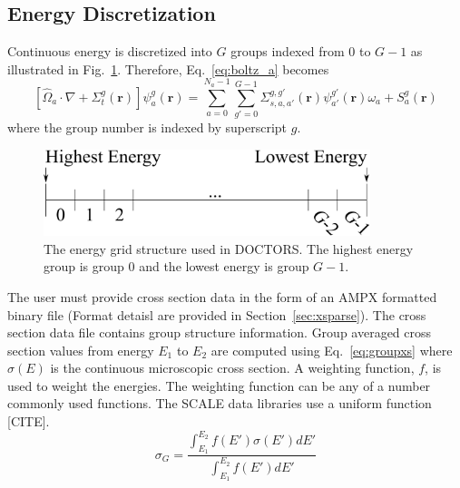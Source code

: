 \subsection{Energy Discretization}

Continuous energy is discretized into $G$ groups indexed from 0 to $G-1$ as illustrated in Fig.~\ref{fig:energy_groups}. Therefore, Eq.~\ref{eq:boltz_a} becomes
\begin{equation} \label{eq:boltz_e}
\left[ \hat{\Omega}_a \cdot \nabla + \Sigma_t^g(\boldsymbol{r}) \right]
\psi_{a}^{g}(\boldsymbol{r}) = 
\sum_{a=0}^{N_a-1} \sum_{g'=0}^{G-1} \Sigma_{s, a, a'}^{g, g'}(\boldsymbol{r}) \psi_{a'}^{g'}(\boldsymbol{r}) \omega_a + S_a^g(\boldsymbol{r})
\end{equation}
where the group number is indexed by superscript $g$.

\begin{figure}[tb]
  \begin{center}
   \includegraphics[width=3.75in]{figs/energy_groups}
  \end{center}
  \caption{The energy grid structure used in DOCTORS. The highest energy group is group 0 and the lowest energy is group $G-1$.}
\label{fig:energy_groups}
\end{figure}

The user must provide cross section data in the form of an AMPX formatted binary file (Format detaisl are provided in Section~\ref{sec:xsparse}). The cross section data file contains group structure information. Group averaged cross section values from energy $E_1$ to $E_2$ are computed using Eq.~\ref{eq:groupxs} where $\sigma(E)$ is the continuous microscopic cross section. A weighting function, $f$, is used to weight the energies. The weighting function can be any of a number commonly used functions. The SCALE data libraries use a uniform function [CITE].
\begin{equation}\label{eq:groupxs}
\sigma_G = \frac{\int_{E_1}^{E_2}f(E')\sigma(E') dE'}{\int_{E_1}^{E_2} f(E') dE'}
\end{equation}

